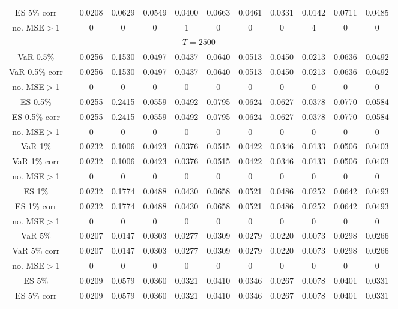 {{\begin{sidewaystable}
\begin{tabular}{cc cc | cccc | cccc}
ES 5\% corr && 0.0208 & 0.0629 & 0.0549 & 0.0400 & 0.0663 & 0.0461 &0.0331 & 0.0142 & 0.0711 & 0.0485 \\ 
no. MSE$>$1 && 0 & 0 & 0 & 1 & 0 & 0 &0 & 4 & 0 & 0 \\[1ex] 
\hline 
\multicolumn{12}{c}{$T =2500$}  \\ 
\hline 
VaR 0.5\% && 0.0256 & 0.1530 & 0.0497 & 0.0437 & 0.0640 & 0.0513 &0.0450 & 0.0213 & 0.0636 & 0.0492 \\ 
VaR 0.5\% corr && 0.0256 & 0.1530 & 0.0497 & 0.0437 & 0.0640 & 0.0513 &0.0450 & 0.0213 & 0.0636 & 0.0492 \\ 
no. MSE$>$1 && 0 & 0 & 0 & 0 & 0 & 0 &0 & 0 & 0 & 0 \\[1ex] 
ES 0.5\% && 0.0255 & 0.2415 & 0.0559 & 0.0492 & 0.0795 & 0.0624 &0.0627 & 0.0378 & 0.0770 & 0.0584 \\ 
ES 0.5\% corr && 0.0255 & 0.2415 & 0.0559 & 0.0492 & 0.0795 & 0.0624 &0.0627 & 0.0378 & 0.0770 & 0.0584 \\ 
no. MSE$>$1 && 0 & 0 & 0 & 0 & 0 & 0 &0 & 0 & 0 & 0 \\[1.5ex]  
 \rowcolor{LightCyan} 
VaR 1\% && 0.0232 & 0.1006 & 0.0423 & 0.0376 & 0.0515 & 0.0422 &0.0346 & 0.0133 & 0.0506 & 0.0403 \\  
 \rowcolor{LightCyan} 
VaR 1\% corr && 0.0232 & 0.1006 & 0.0423 & 0.0376 & 0.0515 & 0.0422 &0.0346 & 0.0133 & 0.0506 & 0.0403 \\ 
 \rowcolor{LightCyan} 
no. MSE$>$1 && 0 & 0 & 0 & 0 & 0 & 0 &0 & 0 & 0 & 0 \\[1ex] 
 \rowcolor{LightCyan} 
ES 1\% && 0.0232 & 0.1774 & 0.0488 & 0.0430 & 0.0658 & 0.0521 &0.0486 & 0.0252 & 0.0642 & 0.0493 \\ 
 \rowcolor{LightCyan} 
ES 1\% corr && 0.0232 & 0.1774 & 0.0488 & 0.0430 & 0.0658 & 0.0521 &0.0486 & 0.0252 & 0.0642 & 0.0493 \\ 
 \rowcolor{LightCyan} 
no. MSE$>$1 && 0 & 0 & 0 & 0 & 0 & 0 &0 & 0 & 0 & 0 \\[1.5ex] 
VaR 5\% && 0.0207 & 0.0147 & 0.0303 & 0.0277 & 0.0309 & 0.0279 &0.0220 & 0.0073 & 0.0298 & 0.0266 \\ 
VaR 5\% corr && 0.0207 & 0.0147 & 0.0303 & 0.0277 & 0.0309 & 0.0279 &0.0220 & 0.0073 & 0.0298 & 0.0266 \\ 
no. MSE$>$1 && 0 & 0 & 0 & 0 & 0 & 0 &0 & 0 & 0 & 0 \\[1ex] 
ES 5\% && 0.0209 & 0.0579 & 0.0360 & 0.0321 & 0.0410 & 0.0346 &0.0267 & 0.0078 & 0.0401 & 0.0331 \\ 
ES 5\% corr && 0.0209 & 0.0579 & 0.0360 & 0.0321 & 0.0410 & 0.0346 &0.0267 & 0.0078 & 0.0401 & 0.0331 \\ 

\end{tabular}
\end{sidewaystable}}}
